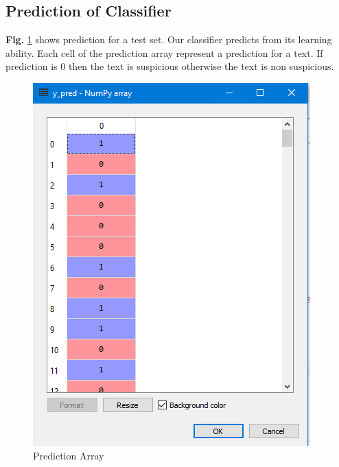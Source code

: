 \subsection{Prediction of Classifier}
\textbf{Fig.} \ref{fig:prd} shows prediction for a test set.
Our classifier predicts from its learning ability. Each cell of the prediction array represent a prediction for a text. If prediction is $0$ then the text is suspicious otherwise the text is non suspicious.
\begin{figure}[h!]
    \centering
    \includegraphics[scale=0.55]{Figures/prediction.PNG}
    \caption{Prediction Array}
    \label{fig:prd}
\end{figure}

